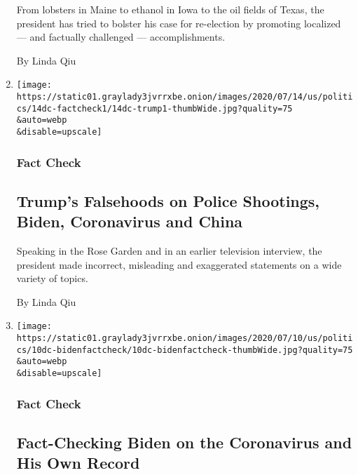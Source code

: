 \begin{enumerate}
  From lobsters in Maine to ethanol in Iowa to the oil fields of Texas,
  the president has tried to bolster his case for re-election by
  promoting localized --- and factually challenged --- accomplishments.

  By Linda Qiu
\item
  \href{/2020/07/14/us/politics/trump-fact-check-biden-police-coronavirus-china.html}{}

  \texttt{[image: https://static01.graylady3jvrrxbe.onion/images/2020/07/14/us/politics/14dc-factcheck1/14dc-trump1-thumbWide.jpg?quality=75\\\&auto=webp\\\&disable=upscale]}

  \hypertarget{fact-check-6}{%
  \subsubsection{Fact Check}\label{fact-check-6}}

  \hypertarget{trumps-falsehoods-on-police-shootings-biden-coronavirus-and-china}{%
  \subsection{Trump's Falsehoods on Police Shootings, Biden, Coronavirus
  and
  China}\label{trumps-falsehoods-on-police-shootings-biden-coronavirus-and-china}}

  Speaking in the Rose Garden and in an earlier television interview,
  the president made incorrect, misleading and exaggerated statements on
  a wide variety of topics.

  By Linda Qiu
\item
  \href{/2020/07/11/us/politics/fact-checking-biden-on-the-coronavirus-and-his-own-record.html}{}

  \texttt{[image: https://static01.graylady3jvrrxbe.onion/images/2020/07/10/us/politics/10dc-bidenfactcheck/10dc-bidenfactcheck-thumbWide.jpg?quality=75\\\&auto=webp\\\&disable=upscale]}

  \hypertarget{fact-check-7}{%
  \subsubsection{Fact Check}\label{fact-check-7}}

  \hypertarget{fact-checking-biden-on-the-coronavirus-and-his-own-record}{%
  \subsection{Fact-Checking Biden on the Coronavirus and His Own
  Record}\label{fact-checking-biden-on-the-coronavirus-and-his-own-record}}


\end{enumerate}
